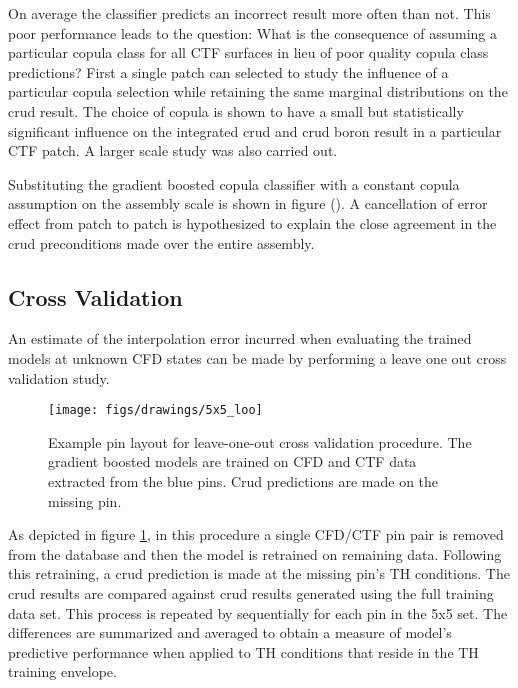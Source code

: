 On average the classifier predicts an incorrect result more often than not.  This poor performance leads to the question:  What is the consequence of assuming a particular copula class for all CTF surfaces in lieu of poor quality copula class predictions?  First a single patch can selected to study the influence of a particular copula selection while retaining the same marginal distributions on the crud result.  The choice of copula is shown to have a small but statistically significant influence on the integrated crud and crud boron result in a particular CTF patch.  A larger scale study was also carried out.

Substituting the gradient boosted copula classifier with a constant copula assumption on the assembly scale is shown in figure ().  A cancellation of error effect from patch to patch is hypothesized to explain the close agreement in the crud preconditions made over the entire assembly.


\subsection{Cross Validation}

An estimate of the interpolation error incurred when evaluating the trained models at unknown CFD states can be made by performing a leave one out cross validation study.

\begin{figure}[h]
    \centering
    \texttt{[image: figs/drawings/5x5\_loo]}
    \caption[Example pin layout for leave-one-out cross validation procedure.]{Example pin layout for leave-one-out cross validation procedure.  The gradient boosted models are trained on CFD and CTF data extracted from the blue pins.  Crud predictions are made on the missing pin.}
    \label{fig:5x5loo}
\end{figure}


As depicted in figure \ref{fig:5x5loo}, in this procedure a single CFD/CTF pin pair is removed from the database and then the model is retrained on remaining data.  Following this retraining, a crud prediction is made 
at the missing pin's TH conditions.  The crud results are compared against crud results generated using the full training data set.  This process is repeated by sequentially for each pin in the 5x5 set.  The differences are summarized and averaged to obtain a measure of model's predictive performance when applied to TH conditions that reside in the TH training envelope.

